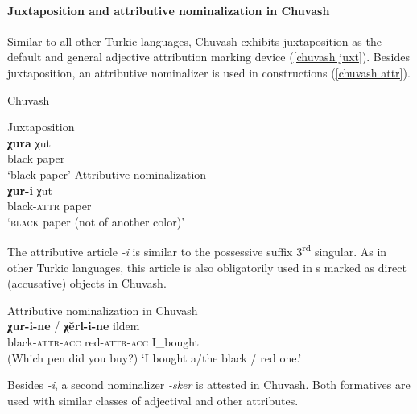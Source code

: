 \paragraph*{Juxtaposition and attributive nominalization in Chuvash}
\label{chuvash synchr}
Similar to all other Turkic languages, Chuvash exhibits juxtaposition as the default and general adjective attribution marking device (\ref{chuvash juxt}). Besides juxtaposition, an attributive nominalizer is used in  constructions (\ref{chuvash attr}).
\begin{exe}
\ex	
{\rm Chuvash \citep{clark1998a}}
\begin{xlist}
\ex 	
\label{chuvash juxt}
{\rm Juxtaposition}\\
\gll	\textbf{χura} χut\\
	black paper\\
\glt	‘black paper’
\ex	
\label{chuvash attr}
{\rm Attributive nominalization}\\
\gll	\textbf{χur-i} χut\\					 		
	black-\textsc{attr} paper\\
\glt	‘\textsc{black} paper (not of another color)’
\end{xlist}
\end{exe}
The attributive article \textit{-i} is similar to the possessive suffix 3\textsuperscript{rd} singular. As in other Turkic languages, this article is also obligatorily used in s marked as direct (accusative) objects in Chuvash.
\begin{exe}
\ex 
\label{chuvash headless acc}	
{\rm Attributive nominalization in Chuvash \citep[7]{benzing1993b}}\\
\gll	\textbf{χur-i-ne} / \textbf{χĕrl-i-ne} ildem\\
 	black-\textsc{attr}-\textsc{acc} { } red-\textsc{attr}-\textsc{acc} I\_bought\\
\glt 	(Which pen did you buy?) ‘I bought a/the black / red one.’
\end{exe}
Besides \textit{-i}, a second nominalizer \textit{-sker} is attested in Chuvash. Both formatives are used with similar classes of adjectival and other attributes.
